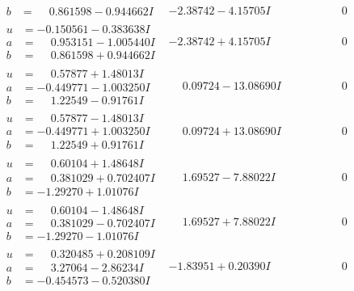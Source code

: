 \documentclass[1p]{elsarticle_modified}
\theoremstyle{definition}
\begin{document}
$$\begin{array}{c|c|c}
\begin{aligned}
b &= \phantom{-}0.861598 - 0.944662 I\end{aligned}
 & -2.38742 - 4.15705 I & \phantom{-0.000000 } 0 \\ \hline\begin{aligned}
u &= -0.150561 - 0.383638 I \\
a &= \phantom{-}0.953151 - 1.005440 I \\
b &= \phantom{-}0.861598 + 0.944662 I\end{aligned}
 & -2.38742 + 4.15705 I & \phantom{-0.000000 } 0 \\ \hline\begin{aligned}
u &= \phantom{-}0.57877 + 1.48013 I \\
a &= -0.449771 - 1.003250 I \\
b &= \phantom{-}1.22549 - 0.91761 I\end{aligned}
 & \phantom{-}0.09724 - 13.08690 I & \phantom{-0.000000 } 0 \\ \hline\begin{aligned}
u &= \phantom{-}0.57877 - 1.48013 I \\
a &= -0.449771 + 1.003250 I \\
b &= \phantom{-}1.22549 + 0.91761 I\end{aligned}
 & \phantom{-}0.09724 + 13.08690 I & \phantom{-0.000000 } 0 \\ \hline\begin{aligned}
u &= \phantom{-}0.60104 + 1.48648 I \\
a &= \phantom{-}0.381029 + 0.702407 I \\
b &= -1.29270 + 1.01076 I\end{aligned}
 & \phantom{-}1.69527 - 7.88022 I & \phantom{-0.000000 } 0 \\ \hline\begin{aligned}
u &= \phantom{-}0.60104 - 1.48648 I \\
a &= \phantom{-}0.381029 - 0.702407 I \\
b &= -1.29270 - 1.01076 I\end{aligned}
 & \phantom{-}1.69527 + 7.88022 I & \phantom{-0.000000 } 0 \\ \hline\begin{aligned}
u &= \phantom{-}0.320485 + 0.208109 I \\
a &= \phantom{-}3.27064 - 2.86234 I \\
b &= -0.454573 - 0.520380 I\end{aligned}
 & -1.83951 + 0.20390 I & \phantom{-0.000000 } 0 \\ \hline\begin{aligned}

\end{aligned}
\end{array}$$
\end{document}
